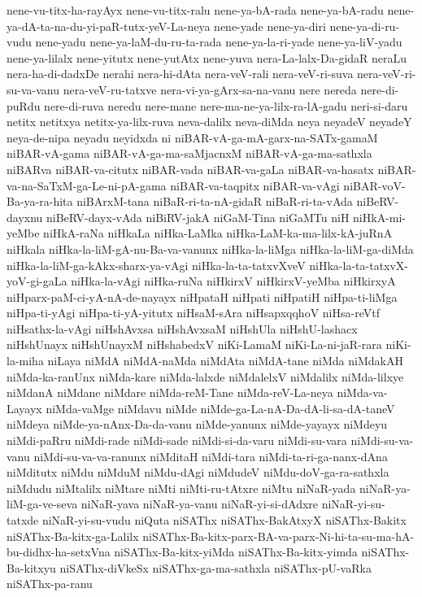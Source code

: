 {nene-vu-titx-ha-rayAyx
nene-vu-titx-ralu
nene-ya-bA-rada
nene-ya-bA-radu
nene-ya-dA-ta-na-du-yi-paR-tutx-yeV-La-neya
nene-yade
nene-ya-diri
nene-ya-di-ru-vudu
nene-yadu
nene-ya-laM-du-ru-ta-rada
nene-ya-la-ri-yade
nene-ya-liV-yadu
nene-ya-lilalx
nene-yitutx
nene-yutAtx
nene-yuva
nera-La-lalx-Da-gidaR
neraLu
nera-ha-di-dadxDe
nerahi
nera-hi-dAta
nera-veV-rali
nera-veV-ri-suva
nera-veV-ri-su-va-vanu
nera-veV-ru-tatxve
nera-vi-ya-gArx-sa-na-vanu
nere
nereda
nere-di-puRdu
nere-di-ruva
neredu
nere-mane
nere-ma-ne-ya-lilx-ra-lA-gadu
neri-si-daru
netitx
netitxya
netitx-ya-lilx-ruva
neva-dalilx
neva-diMda
neya
neyadeV
neyadeY
neya-de-nipa
neyadu
neyidxda
ni
niBAR-vA-ga-mA-garx-na-SATx-gamaM
niBAR-vA-gama
niBAR-vA-ga-ma-saMjacnxM
niBAR-vA-ga-ma-sathxla
niBARva
niBAR-va-citutx
niBAR-vada
niBAR-va-gaLa
niBAR-va-hasatx
niBAR-va-na-SaTxM-ga-Le-ni-pA-gama
niBAR-va-taqpitx
niBAR-va-vAgi
niBAR-voV-Ba-ya-ra-hita
niBArxM-tana
niBaR-ri-ta-nA-gidaR
niBaR-ri-ta-vAda
niBeRV-dayxnu
niBeRV-dayx-vAda
niBiRV-jakA
niGaM-Tina
niGaMTu
niH
niHkA-mi-yeMbe
niHkA-raNa
niHkaLa
niHka-LaMka
niHka-LaM-ka-ma-lilx-kA-juRnA
niHkala
niHka-la-liM-gA-nu-Ba-va-vanunx
niHka-la-liMga
niHka-la-liM-ga-diMda
niHka-la-liM-ga-kAkx-sharx-ya-vAgi
niHka-la-ta-tatxvXveV
niHka-la-ta-tatxvX-yoV-gi-gaLa
niHka-la-vAgi
niHka-ruNa
niHkirxV
niHkirxV-yeMba
niHkirxyA
niHparx-paM-ci-yA-nA-de-nayayx
niHpataH
niHpati
niHpatiH
niHpa-ti-liMga
niHpa-ti-yAgi
niHpa-ti-yA-yitutx
niHsaM-sAra
niHsapxqqhoV
niHsa-reVtf
niHsathx-la-vAgi
niHshAvxsa
niHshAvxsaM
niHshUla
niHshU-lashacx
niHshUnayx
niHshUnayxM
niHshabedxV
niKi-LamaM
niKi-La-ni-jaR-rara
niKi-la-miha
niLaya
niMdA
niMdA-naMda
niMdAta
niMdA-tane
niMda
niMdakAH
niMda-ka-ranUnx
niMda-kare
niMda-lalxde
niMdalelxV
niMdalilx
niMda-lilxye
niMdanA
niMdane
niMdare
niMda-reM-Tane
niMda-reV-La-neya
niMda-va-Layayx
niMda-vaMge
niMdavu
niMde
niMde-ga-La-nA-Da-dA-li-sa-dA-taneV
niMdeya
niMde-ya-nAnx-Da-da-vanu
niMde-yanunx
niMde-yayayx
niMdeyu
niMdi-paRru
niMdi-rade
niMdi-sade
niMdi-si-da-varu
niMdi-su-vara
niMdi-su-va-vanu
niMdi-su-va-va-ranunx
niMditaH
niMdi-tara
niMdi-ta-ri-ga-nanx-dAna
niMditutx
niMdu
niMduM
niMdu-dAgi
niMdudeV
niMdu-doV-ga-ra-sathxla
niMdudu
niMtalilx
niMtare
niMti
niMti-ru-tAtxre
niMtu
niNaR-yada
niNaR-ya-liM-ga-ve-seva
niNaR-yava
niNaR-ya-vanu
niNaR-yi-si-dAdxre
niNaR-yi-su-tatxde
niNaR-yi-su-vudu
niQuta
niSAThx
niSAThx-BakAtxyX
niSAThx-Bakitx
niSAThx-Ba-kitx-ga-Lalilx
niSAThx-Ba-kitx-parx-BA-va-parx-Ni-hi-ta-su-ma-hA-bu-didhx-ha-setxVna
niSAThx-Ba-kitx-yiMda
niSAThx-Ba-kitx-yimda
niSAThx-Ba-kitxyu
niSAThx-diVkeSx
niSAThx-ga-ma-sathxla
niSAThx-pU-vaRka
niSAThx-pa-ranu
}
